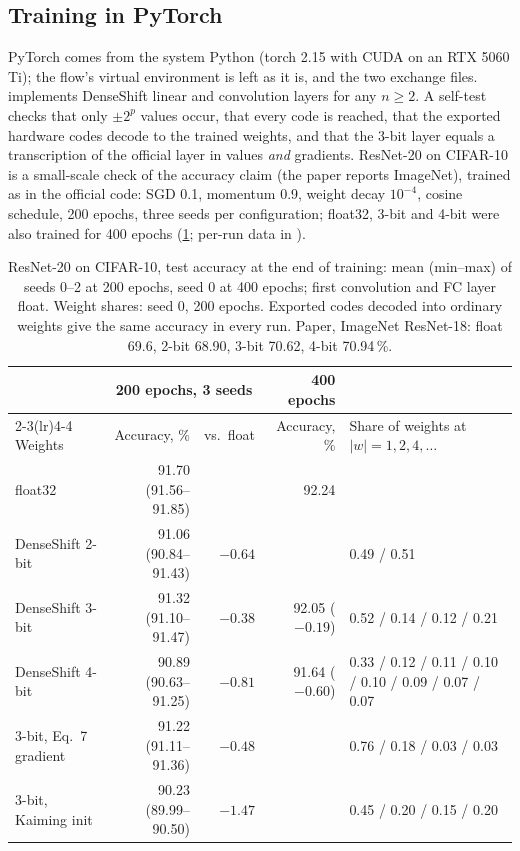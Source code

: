 \subsection{Training in PyTorch}
\label{sec:ds:train}
PyTorch comes from the system Python (torch 2.15 with CUDA on an RTX 5060 Ti); the flow's virtual environment is left
as it is, and the two exchange files.  implements DenseShift linear and
convolution layers for any \(n \ge 2\). A self-test checks that only \(\pm2^p\) values occur, that every code is
reached, that the exported hardware codes decode to the trained weights, and that the 3-bit layer equals a
transcription of the official layer in values \emph{and} gradients. ResNet-20 on CIFAR-10 is a small-scale check of
the accuracy claim (the paper reports ImageNet), trained as in the official code: SGD 0.1, momentum 0.9, weight decay
\(10^{-4}\), cosine schedule, 200 epochs, three seeds per configuration; float32, 3-bit and 4-bit were also trained
for 400 epochs (\cref{tab:ds-cifar}; per-run data in ).

\begin{table}[ht]
\centering\footnotesize\setlength{\tabcolsep}{4pt}
\caption{ResNet-20 on CIFAR-10, test accuracy at the end of training: mean (min--max) of seeds 0--2 at 200 epochs,
  seed 0 at 400 epochs; first convolution and FC layer float. Weight shares: seed 0, 200 epochs. Exported codes
  decoded into ordinary weights give the same accuracy in every run. Paper, ImageNet ResNet-18: float 69.6, 2-bit
  68.90, 3-bit 70.62, 4-bit 70.94\,\%.}
\label{tab:ds-cifar}
\begin{tabular}{@{}lrrrl@{}}
\toprule
& \multicolumn{2}{c}{200 epochs, 3 seeds} & 400 epochs & \\
\cmidrule(lr){2-3}\cmidrule(lr){4-4}
Weights & Accuracy, \% & vs.\ float & Accuracy, \% & Share of weights at \(|w| = 1, 2, 4, \dots\) \\
\midrule
float32 & 91.70 (91.56--91.85) & & 92.24 & \\
DenseShift 2-bit & 91.06 (90.84--91.43) & \(-0.64\) & & 0.49 / 0.51 \\
DenseShift 3-bit & 91.32 (91.10--91.47) & \(-0.38\) & 92.05 (\(-0.19\)) & 0.52 / 0.14 / 0.12 / 0.21 \\
DenseShift 4-bit & 90.89 (90.63--91.25) & \(-0.81\) & 91.64 (\(-0.60\)) & 0.33 / 0.12 / 0.11 / 0.10 / 0.10 / 0.09 / 0.07 / 0.07 \\
\midrule
3-bit, Eq.~7 gradient & 91.22 (91.11--91.36) & \(-0.48\) & & 0.76 / 0.18 / 0.03 / 0.03 \\
3-bit, Kaiming init & 90.23 (89.99--90.50) & \(-1.47\) & & 0.45 / 0.20 / 0.15 / 0.20 \\
\bottomrule
\end{tabular}
\end{table}

